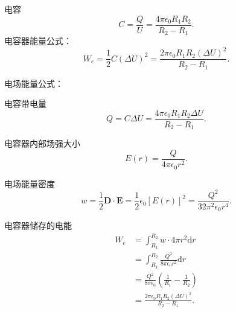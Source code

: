 \documentclass[twocolumn]{ctexart}
\begin{document}
	电容
	$$C=\frac{Q}{U}=\frac{4\pi\epsilon_0R_1R_2}{R_2-R_1}.$$
	\noindent
	电容器能量公式：
	$$W_e=\frac{1}{2}C(\Delta U)^2=\frac{2\pi\epsilon_0R_1R_2(\Delta U)^2}{R_2-R_1}.$$
	
	\noindent
	电场能量公式：
	
	电容带电量
	$$Q=C\Delta U=\frac{4\pi\epsilon_0R_1R_2\Delta U}{R_2-R_1}.$$
	
	电容器内部场强大小
	$$E(r)=\frac{Q}{4\pi\epsilon_0 r^2}.$$
	
	电场能量密度
	$$w=\frac{1}{2}\mathbf{D}\cdot\mathbf{E}=\frac{1}{2}\epsilon_0\left[E(r)\right]^2=\frac{Q^2}{32\pi^2\epsilon_0 r^4}.$$
	
	电容器储存的电能
	\begin{align*}
		W_e&=\int_{R_1}^{R_2}w\cdot4\pi r^2\mathrm{d}r\\
		&=\int_{R_1}^{R_2}\frac{Q^2}{8\pi\epsilon_0 r^2}\mathrm{d}r\\
		&=\frac{Q^2}{8\pi\epsilon_0}\left(\frac{1}{R_1}-\frac{1}{R_2}\right)\\
		&=\frac{2\pi\epsilon_0R_1R_2(\Delta U)^2}{R_2-R_1}.
	\end{align*}
	
\end{document}
